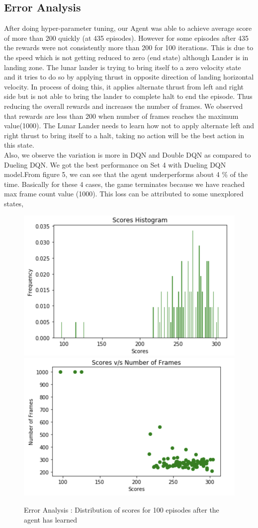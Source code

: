 \subsection{ Error Analysis}
 After doing hyper-parameter tuning, our Agent was able to achieve average score of more than 200 quickly (at 435 episodes). 
However for some episodes after 435 the rewards were not consistently more than 200 for 100 iterations. This is due to the speed 
which is not getting reduced to zero (end state) although Lander is in landing zone.  The lunar lander is trying to bring itself to a zero velocity state and it tries to do so by applying thrust in opposite direction of landing horizontal velocity. In process of doing this, it applies alternate thrust from left and right side but is not able to bring the lander to complete halt to end the episode. Thus reducing the overall rewards and increases the number of frames. We observed that rewards are less than 200 when number of frames reaches the maximum value(1000). The Lunar Lander needs to learn how not to apply alternate left and right thrust to bring itself to a halt, taking no action will be the best action in this state. \\

Also, we observe the variation is more in DQN and Double DQN as compared to Dueling DQN. We got the best performance on Set 4 with Dueling DQN model.From figure 5, we can see that the agent underperforms about 4 \% of the time. Basically for these 4 cases, the game terminates because we have reached max frame count value (1000). This loss can be attributed to some unexplored states,


\begin{figure}[!ht]
\centering
\includegraphics[scale=0.50,width=0.50\columnwidth]{figures/Histogram.png}%
\includegraphics[scale=0.50,width=0.50\columnwidth]{figures/Frames.png}%
\caption{ Error Analysis : Distribution of scores for 100 episodes after the agent has learned }

\label{fig:Error Analysis}%
\end{figure}

